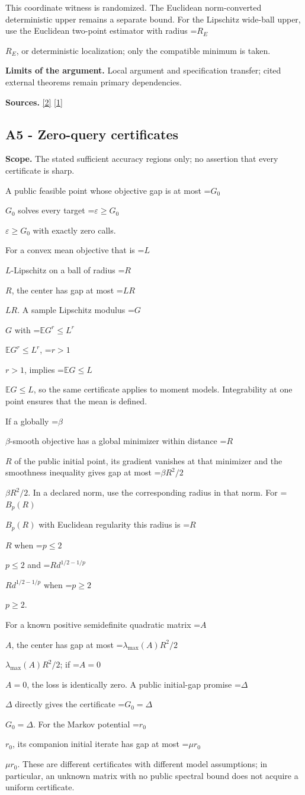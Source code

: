 \documentclass[10pt,a4paper]{article}
\newcommand{\AtlasMath}[1]{\par\begingroup\centering\setbox0=\hbox{$\displaystyle #1$}\ifdim\wd0>1.4\linewidth\typeout{ATLAS WIDE FORMULA: \the\wd0}\fi\ifdim\wd0>\linewidth\resizebox{\linewidth}{!}{\box0}\else\box0\fi\par\endgroup}
\newcommand{\AtlasInlineMath}[1]{\begingroup\setbox0=\hbox{$#1$}\ifdim\wd0>.4\linewidth\endgroup\AtlasMath{#1}\else\endgroup$#1$\fi}
\begin{document}
This coordinate witness is randomized. The Euclidean norm-converted deterministic upper remains a separate bound. For the Lipschitz wide-ball upper, use the Euclidean two-point estimator with radius \AtlasInlineMath{R_E}, or deterministic localization; only the compatible minimum is taken.

\textbf{Limits of the argument.} Local argument and specification transfer; cited external theorems remain primary dependencies.

\textbf{Sources.} \href{https://arxiv.org/pdf/1707.08486v2}{[2]} \href{https://arxiv.org/html/2610.00345v1}{[1]}

\subsection{A5 - Zero-query certificates}
\textbf{Scope.} The stated sufficient accuracy regions only; no assertion that every certificate is sharp.

A public feasible point whose objective gap is at most \AtlasInlineMath{G_0} solves every target \AtlasInlineMath{\varepsilon\ge G_0} with exactly zero calls.

For a convex mean objective that is \AtlasInlineMath{L}-Lipschitz on a ball of radius \AtlasInlineMath{R}, the center has gap at most \AtlasInlineMath{LR}. A sample Lipschitz modulus \AtlasInlineMath{G} with \AtlasInlineMath{\mathbb E G^r\le L^r}, \AtlasInlineMath{r>1}, implies \AtlasInlineMath{\mathbb E G\le L}, so the same certificate applies to moment models. Integrability at one point ensures that the mean is defined.

If a globally \AtlasInlineMath{\beta}-smooth objective has a global minimizer within distance \AtlasInlineMath{R} of the public initial point, its gradient vanishes at that minimizer and the smoothness inequality gives gap at most \AtlasInlineMath{\beta R^2/2}. In a declared norm, use the corresponding radius in that norm. For \AtlasInlineMath{B_p(R)} with Euclidean regularity this radius is \AtlasInlineMath{R} when \AtlasInlineMath{p\le2} and \AtlasInlineMath{R d^{1/2-1/p}} when \AtlasInlineMath{p\ge2}.

For a known positive semidefinite quadratic matrix \AtlasInlineMath{A}, the center has gap at most \AtlasInlineMath{\lambda_{\max}(A)R^2/2}; if \AtlasInlineMath{A=0}, the loss is identically zero. A public initial-gap promise \AtlasInlineMath{\Delta} directly gives the certificate \AtlasInlineMath{G_0=\Delta}. For the Markov potential \AtlasInlineMath{r_0}, its companion initial iterate has gap at most \AtlasInlineMath{\mu r_0}. These are different certificates with different model assumptions; in particular, an unknown matrix with no public spectral bound does not acquire a uniform certificate.
\end{document}
